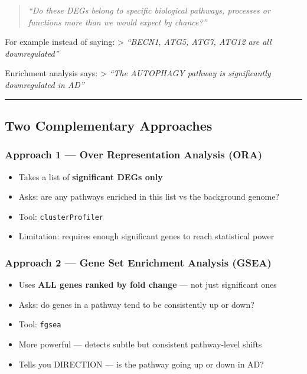 \documentclass[
]{article}
\providecommand{\tightlist}{%
  \setlength{\itemsep}{0pt}\setlength{\parskip}{0pt}}
\begin{document}
\begin{quote}
\emph{``Do these DEGs belong to specific biological pathways, processes
or functions more than we would expect by chance?''}
\end{quote}

For example instead of saying: \textgreater{} \emph{``BECN1, ATG5, ATG7,
ATG12 are all downregulated''}

Enrichment analysis says: \textgreater{} \emph{``The AUTOPHAGY pathway
is significantly downregulated in AD''}

\begin{center}\rule{0.5\linewidth}{0.5pt}\end{center}

\subsection{Two Complementary
Approaches}\label{two-complementary-approaches}

\subsubsection{Approach 1 --- Over Representation Analysis
(ORA)}\label{approach-1-over-representation-analysis-ora}

\begin{itemize}
\tightlist
\item
  Takes a list of \textbf{significant DEGs only}
\item
  Asks: are any pathways enriched in this list vs the background genome?
\item
  Tool: \texttt{clusterProfiler}
\item
  Limitation: requires enough significant genes to reach statistical
  power
\end{itemize}

\subsubsection{Approach 2 --- Gene Set Enrichment Analysis
(GSEA)}\label{approach-2-gene-set-enrichment-analysis-gsea}

\begin{itemize}
\tightlist
\item
  Uses \textbf{ALL genes ranked by fold change} --- not just significant
  ones
\item
  Asks: do genes in a pathway tend to be consistently up or down?
\item
  Tool: \texttt{fgsea}
\item
  More powerful --- detects subtle but consistent pathway-level shifts
\item
  Tells you DIRECTION --- is the pathway going up or down in AD?
\end{itemize}
\end{document}
